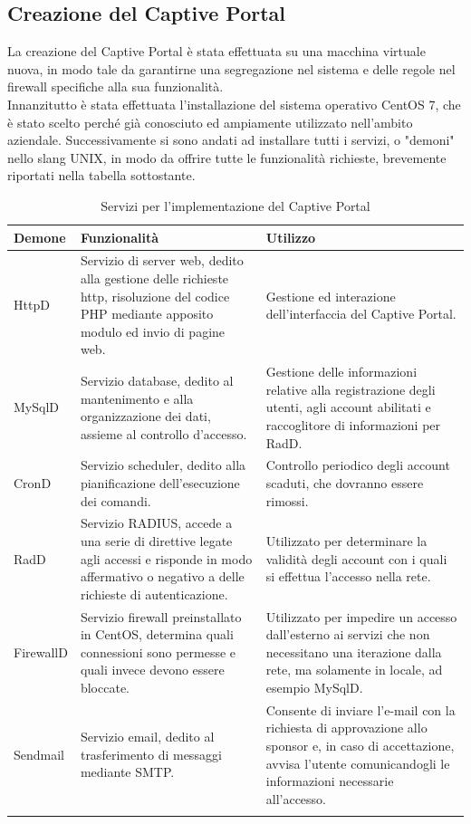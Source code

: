 \documentclass[Realizzazione.tex]{subfiles}
\begin{document}
\newpage
\subsection{Creazione del Captive Portal}
La creazione del Captive Portal è stata effettuata su una macchina virtuale nuova, in modo tale da garantirne una segregazione nel sistema e delle regole nel firewall specifiche alla sua funzionalità. \\
Innanzitutto è stata effettuata l'installazione del sistema operativo CentOS 7, che è stato scelto perché già conosciuto ed ampiamente utilizzato nell'ambito aziendale.
Successivamente si sono andati ad installare tutti i servizi, o "demoni" nello slang UNIX, in modo da offrire tutte le funzionalità richieste, brevemente riportati nella tabella sottostante.

\label{table:Servizi per l'implementazione del Captive Portal}
\renewcommand*{\arraystretch}{1.2}
\begin{longtable}[H]{p{2.6cm}|p{6cm}|p{6cm}}
	\rowcolor{CHeader}
	\color{CHeaderText} \textbf{Demone} & \color{CHeaderText} \textbf{Funzionalità} & \color{CHeaderText} \textbf{Utilizzo} \\
	\endhead
		HttpD
			& Servizio di server web, dedito alla gestione delle richieste http, risoluzione del codice PHP mediante apposito modulo ed invio di pagine web.
			&  Gestione ed interazione dell'interfaccia del Captive Portal. \\
		MySqlD
			& Servizio database, dedito al mantenimento e alla organizzazione dei dati, assieme al controllo d'accesso.
			& Gestione delle informazioni relative alla registrazione degli utenti, agli account abilitati e raccoglitore di informazioni per RadD. \\
		CronD
			& Servizio scheduler, dedito alla pianificazione dell'esecuzione dei comandi.
			& Controllo periodico degli account scaduti, che dovranno essere rimossi. \\
		RadD
			& Servizio RADIUS, accede a una serie di direttive legate agli accessi e risponde in modo affermativo o negativo a delle richieste di autenticazione.
			& Utilizzato per determinare la validità degli account con i quali si effettua l'accesso nella rete. \\
		FirewallD
			& Servizio firewall preinstallato in CentOS, determina quali connessioni sono permesse e quali invece devono essere bloccate.
			& Utilizzato per impedire un accesso dall'esterno ai servizi che non necessitano una iterazione dalla rete, ma solamente in locale, ad esempio MySqlD. \\
		Sendmail
			& Servizio email, dedito al trasferimento di messaggi mediante SMTP.
			& Consente di inviare l'e-mail con la richiesta di approvazione allo sponsor e, in caso di accettazione, avvisa l'utente comunicandogli le informazioni necessarie all'accesso. \\
	\hiderowcolors
	\caption{Servizi per l'implementazione del Captive Portal}
\end{longtable}
\end{document}
